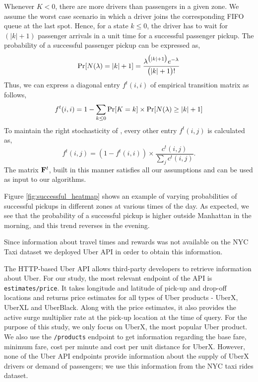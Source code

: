 Whenever %
$K<0$, there are more drivers than passengers in a given zone. We assume the worst case scenario in which a driver joins the corresponding FIFO queue at the last spot. Hence, for a state $k \leq 0$, the driver has to wait for $(|k| + 1)$ passenger arrivals in a unit time for a successful passenger pickup. The probability of a successful passenger pickup can be expressed as,
\begin{equation}
\Pr[N(\lambda) = |k| + 1] = \frac{\lambda^{\big(|k|+1\big)} e^{-\lambda}}{\big(|k| + 1\big)!}
\end{equation}
Thus, we can express a diagonal entry $f^t(i,i)$ of empirical transition matrix as follows,
\begin{equation}
f^t(i,i) = 1 - \sum_{k \leq 0} \Pr[K = k] \times \Pr[N(\lambda) \geq |k| + 1]
\end{equation}
To maintain the right stochasticity of {\empiricaltransitionmatrix}, every other entry 
$f^t(i,j)$ is calculated as,
\begin{equation}
f^t(i,j) = (1 - f^t(i,i)) \times \frac{c^t(i,j)}{\sum_{j}c^t(i,j)}. 
\end{equation}
The matrix ${\mathbf{F}}^t$, built in this manner satisfies all our assumptions and can be used as input to our algorithms. 

Figure \ref{fig:successful_heatmap} shows an example of varying probabilities of successful pickups in different zones at various times of the day. As expected, we see that the probability of a successful pickup is higher outside Manhattan in the morning, and this trend reverses in the evening.

 Since information about travel times 
and rewards was not available on the NYC Taxi dataset we deployed Uber API in order
to obtain this information.


The HTTP-based Uber API allows third-party developers to retrieve information about Uber. For our study, the most relevant endpoint of the API is \texttt{estimates/price}. It takes longitude and latitude of pick-up and drop-off locations and returns price estimates for all types of Uber products - UberX, UberXL and UberBlack. Along with the price estimates, it also provides the active surge multiplier rate at the pick-up location at the time of query. For the purpose of this study, we only focus on UberX, the most popular Uber product. We also use the \texttt{/products} endpoint to get information regarding the base fare, minimum fare, cost per minute and cost per unit distance for UberX. However, none of the Uber API endpoints provide information about the supply of UberX drivers or demand of passengers; we use this information from the
NYC taxi rides dataset.

